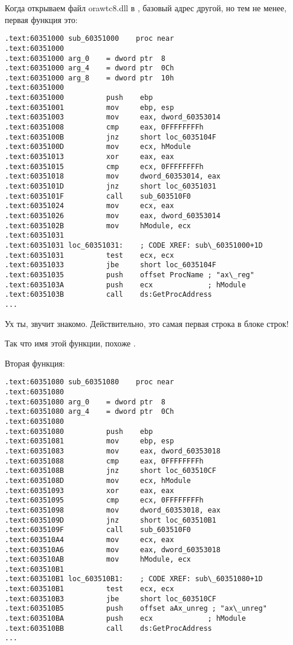 Когда открываем файл orawtc8.dll в \IDA, базовый адрес другой, но тем не менее, первая функция это:

\begin{lstlisting}[style=customasmx86]
.text:60351000 sub_60351000    proc near
.text:60351000
.text:60351000 arg_0    = dword ptr  8
.text:60351000 arg_4    = dword ptr  0Ch
.text:60351000 arg_8    = dword ptr  10h
.text:60351000
.text:60351000          push    ebp
.text:60351001          mov     ebp, esp
.text:60351003          mov     eax, dword_60353014
.text:60351008          cmp     eax, 0FFFFFFFFh
.text:6035100B          jnz     short loc_6035104F
.text:6035100D          mov     ecx, hModule
.text:60351013          xor     eax, eax
.text:60351015          cmp     ecx, 0FFFFFFFFh
.text:60351018          mov     dword_60353014, eax
.text:6035101D          jnz     short loc_60351031
.text:6035101F          call    sub_603510F0
.text:60351024          mov     ecx, eax
.text:60351026          mov     eax, dword_60353014
.text:6035102B          mov     hModule, ecx
.text:60351031
.text:60351031 loc_60351031:    ; CODE XREF: sub\_60351000+1D
.text:60351031          test    ecx, ecx
.text:60351033          jbe     short loc_6035104F
.text:60351035          push    offset ProcName ; "ax\_reg"
.text:6035103A          push    ecx             ; hModule
.text:6035103B          call    ds:GetProcAddress
...
\end{lstlisting}

Ух ты,  звучит знакомо. 
Действительно, это самая первая строка в блоке строк!

Так что имя этой функции, похоже .

Вторая функция:

\begin{lstlisting}[style=customasmx86]
.text:60351080 sub_60351080    proc near
.text:60351080
.text:60351080 arg_0    = dword ptr  8
.text:60351080 arg_4    = dword ptr  0Ch
.text:60351080
.text:60351080          push    ebp
.text:60351081          mov     ebp, esp
.text:60351083          mov     eax, dword_60353018
.text:60351088          cmp     eax, 0FFFFFFFFh
.text:6035108B          jnz     short loc_603510CF
.text:6035108D          mov     ecx, hModule
.text:60351093          xor     eax, eax
.text:60351095          cmp     ecx, 0FFFFFFFFh
.text:60351098          mov     dword_60353018, eax
.text:6035109D          jnz     short loc_603510B1
.text:6035109F          call    sub_603510F0
.text:603510A4          mov     ecx, eax
.text:603510A6          mov     eax, dword_60353018
.text:603510AB          mov     hModule, ecx
.text:603510B1
.text:603510B1 loc_603510B1:    ; CODE XREF: sub\_60351080+1D
.text:603510B1          test    ecx, ecx
.text:603510B3          jbe     short loc_603510CF
.text:603510B5          push    offset aAx_unreg ; "ax\_unreg"
.text:603510BA          push    ecx             ; hModule
.text:603510BB          call    ds:GetProcAddress
...
\end{lstlisting}

